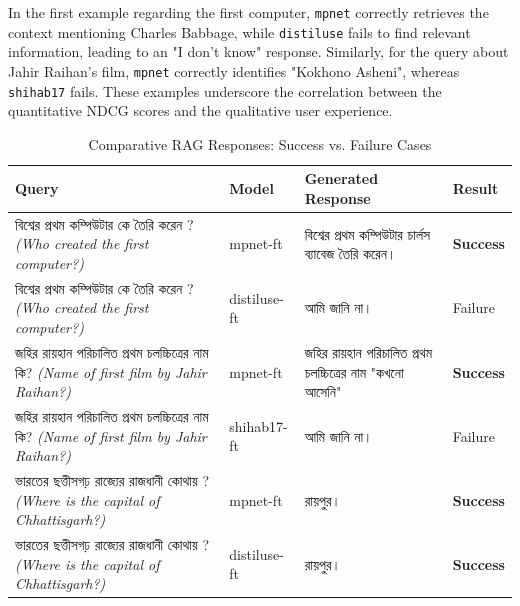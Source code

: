 \documentclass[10pt, conference, compsocconf]{IEEEtran}
\newcommand{\bn}[1]{{\bengalifont #1}}
\begin{document}
In the first example regarding the first computer, \texttt{mpnet} correctly retrieves the context mentioning Charles Babbage, while \texttt{distiluse} fails to find relevant information, leading to an "I don't know" response. Similarly, for the query about Jahir Raihan's film, \texttt{mpnet} correctly identifies "Kokhono Asheni", whereas \texttt{shihab17} fails. These examples underscore the correlation between the quantitative NDCG scores and the qualitative user experience.

\begin{table}[!t]
    \centering
    \caption{Comparative RAG Responses: Success vs. Failure Cases}
    \label{tab:bengali_rag_examples}
    \renewcommand{\arraystretch}{1.4}
    \small
    \begin{tabularx}{\textwidth}{|p{4cm}|p{1.8cm}|X|p{1.5cm}|}
        \hline
        \textbf{Query} & \textbf{Model} & \textbf{Generated Response} & \textbf{Result} \\
        \hline
        \bn{বিশ্বের প্রথম কম্পিউটার কে তৈরি করেন ?} \newline \textit{(Who created the first computer?)} 
        & mpnet-ft & \bn{বিশ্বের প্রথম কম্পিউটার চার্লস ব্যাবেজ তৈরি করেন।} & \textbf{Success} \\
        \hline
        \bn{বিশ্বের প্রথম কম্পিউটার কে তৈরি করেন ?} \newline \textit{(Who created the first computer?)} 
        & distiluse-ft & \bn{আমি জানি না।} & Failure \\
        \hline
        \bn{জহির রায়হান পরিচালিত প্রথম চলচ্চিত্রের নাম কি?} \newline \textit{(Name of first film by Jahir Raihan?)} 
        & mpnet-ft & \bn{জহির রায়হান পরিচালিত প্রথম চলচ্চিত্রের নাম "কখনো আসেনি"} & \textbf{Success} \\
        \hline
        \bn{জহির রায়হান পরিচালিত প্রথম চলচ্চিত্রের নাম কি?} \newline \textit{(Name of first film by Jahir Raihan?)} 
        & shihab17-ft & \bn{আমি জানি না।} & Failure \\
        \hline
        \bn{ভারতের ছত্তীসগঢ় রাজ্যের রাজধানী কোথায় ?} \newline \textit{(Where is the capital of Chhattisgarh?)}
        & mpnet-ft & \bn{রায়পুর।} & \textbf{Success} \\
        \hline
        \bn{ভারতের ছত্তীসগঢ় রাজ্যের রাজধানী কোথায় ?} \newline \textit{(Where is the capital of Chhattisgarh?)}
        & distiluse-ft & \bn{রায়পুর।} & \textbf{Success} \\
        \hline
    \end{tabularx}
\end{table}
\end{document}
